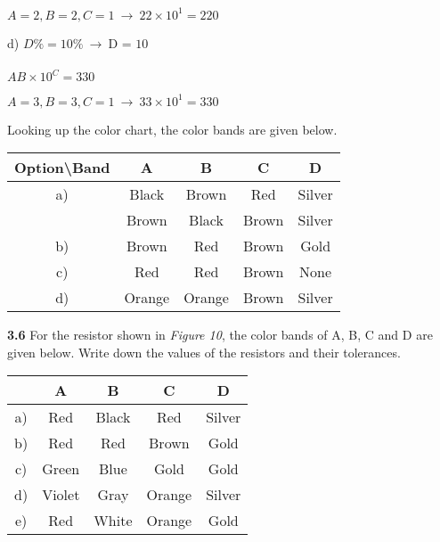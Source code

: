\documentclass{article}
\begin{document}
{{\vspace{4mm}}

{\Large $\boxed{A = 2, B = 2, C = 1} \ \rightarrow \ 22 \times 10^{1} = 220$}

{\vspace{8mm}}

{\Large d) $D\% = 10\% \ \rightarrow \ \boxed{\text{D = 10}}$ \\\\ $AB \times 10^{C} = 330$}

{\vspace{4mm}}

{\Large $\boxed{A = 3, B = 3, C = 1} \ \rightarrow \ 33 \times 10^{1} = 330$}

{\vspace{8mm}}

{\Large Looking up the color chart, the color bands are given below.}

\begin{center}
    \Large
    \begin{tabular}{ |c|c c c c| }
    \hline
        Option\textbackslash Band& A & B & C & D \\
        \hline
        a)& Black & Brown & Red & Silver\\
          & Brown & Black & Brown & Silver\\
        \hline
        b)& Brown & Red & Brown & Gold\\
        \hline
        c)& Red &Red & Brown & None\\ 
        \hline
        d)& Orange & Orange & Brown & Silver\\ 
        \hline
    \end{tabular}
\end{center}

{\vspace{8mm}}

{\Large \textbf{3.6} For the resistor shown in \textit{Figure 10}, the color bands of A, B, C and D are given below. Write down the values of the resistors and their tolerances.}

\begin{center}
    \Large
    \begin{tabular}{ |c|c c c c| } 
    \hline
        & A & B & C & D \\
        \hline
        a)& Red & Black & Red & Silver\\
        \hline
        b)& Red & Red & Brown & Gold \\
        \hline
        c)& Green & Blue & Gold & Gold \\ 
        \hline
        d)& Violet & Gray & Orange & Silver \\ 
        \hline
        e)& Red & White & Orange & Gold \\ 
        \hline
    \end{tabular}
\end{center}

}
\end{document}
